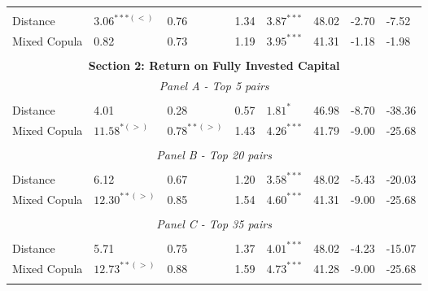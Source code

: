 \documentclass[a4paper]{article}
\begin{document}
\begin{threeparttable}[H]
\begin{tabularx}{\textwidth}{@{\extracolsep{\fill}}llllllll@{}}
		&       &       &       &       &       &       &  \\
		Distance &  $3.06^{***(<)}$ &  0.76  & 1.34  & $3.87^{***}$  & 48.02 & -2.70  & -7.52 \\
		Mixed Copula & 0.82  & 0.73  & 1.19  & $3.95^{***}$  & 41.31 &  -1.18  &  -1.98  \\
		\multicolumn{1}{r}{} & \multicolumn{1}{r}{} & \multicolumn{1}{r}{} & \multicolumn{1}{r}{} & \multicolumn{1}{r}{} & \multicolumn{1}{r}{} & \multicolumn{1}{r}{} & \multicolumn{1}{r}{} \\
		\midrule
		\multicolumn{8}{c}{\textbf{Section 2: Return on Fully Invested Capital}} \\
		\multicolumn{8}{c}{\textit{Panel A - Top 5 pairs}} \\
		&       &       &       &       &       &       &  \\
		Distance & 4.01  & 0.28  & 0.57  & $1.81^{*}$  & 46.98 & -8.70    & -38.36  \\
		Mixed Copula & $11.58^{*(>)}$  & $0.78^{**(>)}$  & 1.43  & $4.26^{***}$  & 41.79 & -9.00  & -25.68 \\
		\multicolumn{1}{r}{} & \multicolumn{1}{r}{} & \multicolumn{1}{r}{} & \multicolumn{1}{r}{} & \multicolumn{1}{r}{} & \multicolumn{1}{r}{} & \multicolumn{1}{r}{} & \multicolumn{1}{r}{} \\
		\multicolumn{8}{c}{\textit{Panel B - Top 20 pairs}} \\
		&       &       &       &       &       &       &  \\
		Distance & 6.12  & 0.67  & 1.20  & $3.58^{***}$  & 48.02 & -5.43  & -20.03 \\
		Mixed Copula  & $12.30^{**(>)}$  & 0.85  & 1.54  & $4.60^{***}$  & 41.31 & -9.00  & -25.68  \\
		\multicolumn{1}{r}{} & \multicolumn{1}{r}{} & \multicolumn{1}{r}{} & \multicolumn{1}{r}{} & \multicolumn{1}{r}{} & \multicolumn{1}{r}{} & \multicolumn{1}{r}{} & \multicolumn{1}{r}{} \\
		\multicolumn{8}{c}{\textit{Panel C - Top 35 pairs}} \\
		&       &       &       &       &       &       &  \\
		Distance & 5.71  & 0.75  & 1.37  & $4.01^{***}$  & 48.02 & -4.23  & -15.07 \\
		Mixed Copula & $12.73^{**(>)}$  & 0.88  & 1.59  & $4.73^{***}$  & 41.28 & -9.00  & -25.68  \\
		\multicolumn{1}{r}{} & \multicolumn{1}{r}{} & \multicolumn{1}{r}{} & \multicolumn{1}{r}{} & \multicolumn{1}{r}{} & \multicolumn{1}{r}{} & \multicolumn{1}{r}{} & \multicolumn{1}{r}{} \\

\end{tabularx}
\end{threeparttable}
\end{document}
